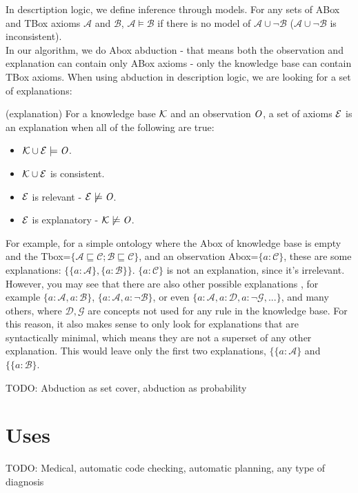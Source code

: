 In descrtiption logic, we define inference through models.  For any sets of ABox and TBox axioms $\mathcal{A}$ and $\mathcal{B}$, $\mathcal{A} \models \mathcal{B}$ if there is no model of $\mathcal{A} \cup \neg \mathcal{B}$ ($\mathcal{A} \cup \neg \mathcal{B}$ is inconsistent).   \\
In our algorithm, we do Abox abduction - that means both the observation and explanation can contain only ABox axioms - only the knowledge base can contain TBox axioms.
When using abduction in description logic, we are looking for a set of explanations:
\begin{mydef} \label{explanation} (explanation) 
For a knowledge base $\mathcal{K}$ and an observation $\mathit{O}$, a set of axioms $\mathcal{E}$ is an explanation when all of the following are true: 
\begin{itemize}
\item $\mathcal{K} \cup \mathcal{E} \models \mathit{O}$.
\item $\mathcal{K} \cup \mathcal{E}$ is consistent.
\item $\mathcal{E}$ is relevant - $\mathcal{E} \not\models \mathit{O}$.
\item $\mathcal{E}$ is explanatory - $\mathcal{K} \not \models \mathit{O}$.
\end{itemize}  
\end{mydef}
For example, for a simple ontology where the Abox of knowledge base is empty and the Tbox=$\{ \mathcal{A} \sqsubseteq \mathcal{C} ; \mathcal{B} \sqsubseteq \mathcal{C} \} $, and an observation Abox=$\{a:\mathcal{C}\}$, these are some explanations: $\{ \{a:\mathcal{A}\},\{ a: \mathcal{B}\}\}$.   $\{a:\mathcal{C}\}$ is not an explanation, since it's irrelevant.\\
However, you may see that there are also other possible explanations , for example $\{ a:\mathcal{A},  a:\mathcal{B} \}$,  $\{ a:\mathcal{A},  a:\neg \mathcal{B} \}$,  or even $\{ a:\mathcal{A} , a:\mathcal{D}, a:\neg \mathcal{G},...\}$, and many others, where $\mathcal{D}, \mathcal{G}$ are concepts not used for any rule in the knowledge base. For this reason, it also makes sense to only look for explanations that are syntactically minimal, which means they are not a superset of any other explanation. This would leave only the first two explanations,  $\{ \{a:\mathcal{A}\}$ and  $\{ \{a:\mathcal{B}\}$.



TODO: Abduction as set cover, abduction as probability
\section{Uses}
TODO: Medical, automatic code checking, automatic planning, any type of diagnosis